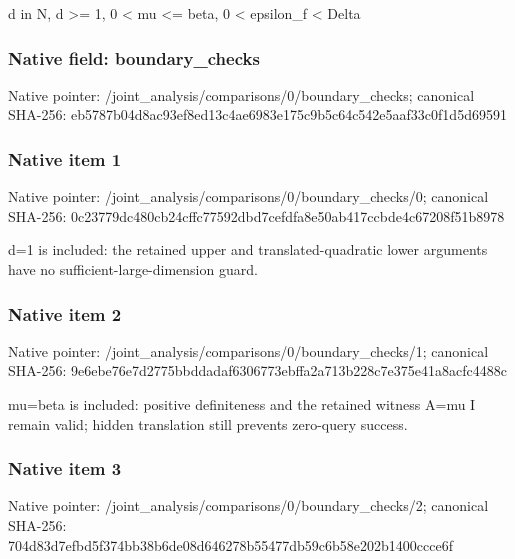 \documentclass[10pt,a4paper]{article}
\begin{document}
\begingroup\raggedright\sloppy d in N,\allowbreak{} d >=\allowbreak{} 1,\allowbreak{} 0 < mu <=\allowbreak{} beta,\allowbreak{} 0 < epsilon\_\allowbreak{}f < Delta\par\endgroup

\subsubsection{Native field: boundary\_\allowbreak{}checks}
Native pointer: /joint\_\allowbreak{}analysis/comparisons/0/boundary\_\allowbreak{}checks; canonical SHA-256: eb5787b04d8ac93ef8ed13c4ae6983e175c9b5c64c542e5aaf33c0f1d5d69591

\subsubsection{Native item 1}
Native pointer: /joint\_\allowbreak{}analysis/comparisons/0/boundary\_\allowbreak{}checks/0; canonical SHA-256: 0c23779dc480cb24cffc77592dbd7cefdfa8e50ab417ccbde4c67208f51b8978

\begingroup\raggedright\sloppy d=\allowbreak{}1 is included:\allowbreak{} the retained upper and translated-quadratic lower arguments have no sufficient-large-dimension guard.\par\endgroup

\subsubsection{Native item 2}
Native pointer: /joint\_\allowbreak{}analysis/comparisons/0/boundary\_\allowbreak{}checks/1; canonical SHA-256: 9e6ebe76e7d2775bbddadaf6306773ebffa2a713b228c7e375e41a8acfc4488c

\begingroup\raggedright\sloppy mu=\allowbreak{}beta is included:\allowbreak{} positive definiteness and the retained witness A=\allowbreak{}mu I remain valid;\allowbreak{} hidden translation still prevents zero-query success.\par\endgroup

\subsubsection{Native item 3}
Native pointer: /joint\_\allowbreak{}analysis/comparisons/0/boundary\_\allowbreak{}checks/2; canonical SHA-256: 704d83d7efbd5f374bb38b6de08d646278b55477db59c6b58e202b1400ccce6f
\end{document}
